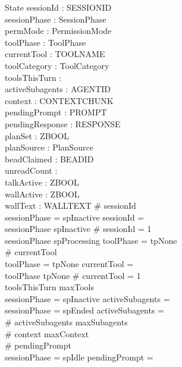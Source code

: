 \documentclass[a4paper,10pt,fleqn]{article}
\begin{document}
\begin{schema}{State}
  sessionId : \finset SESSIONID \\
  sessionPhase : SessionPhase \\
  permMode : PermissionMode \\
  toolPhase : ToolPhase \\
  currentTool : \finset TOOLNAME \\
  toolCategory : ToolCategory \\
  toolsThisTurn : \nat \\
  activeSubagents : \finset AGENTID \\
  context : \seq CONTEXTCHUNK \\
  pendingPrompt : \finset PROMPT \\
  pendingResponse : \finset RESPONSE \\
  planSet : ZBOOL \\
  planSource : \finset PlanSource \\
  beadClaimed : \finset BEADID \\
  unreadCount : \nat \\
  talkActive : ZBOOL \\
  wallActive : ZBOOL \\
  wallText : \finset WALLTEXT
  \where
  \# sessionId  \\
  sessionPhase = spInactive \implies sessionId = \emptyset \\
  sessionPhase \neq spInactive \implies \# sessionId = 1 \\
  sessionPhase \neq spProcessing \implies toolPhase = tpNone \\
  \# currentTool  \\
  toolPhase = tpNone \implies currentTool = \emptyset \\
  toolPhase \neq tpNone \implies \# currentTool = 1 \\
  toolsThisTurn \leq maxTools \\
  sessionPhase = spInactive \implies activeSubagents = \emptyset \\
  sessionPhase = spEnded \implies activeSubagents = \emptyset \\
  \# activeSubagents \leq maxSubagents \\
  \# context \leq maxContext \\
  \# pendingPrompt  \\
  sessionPhase = spIdle \implies pendingPrompt = \emptyset \\

\end{schema}
\end{document}
